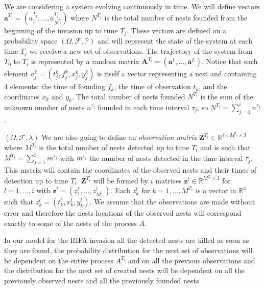 \documentclass[11pt,a4paper]{article}
\renewcommand{\vec}[1]{\mathbf{#1}}
\begin{document}
{{We are considering a system evolving continuously in time. We will define vectors $\vec{a}^{T_j} = (a^{T_j}_1, \dots, a^{T_j}_{N^{T_j}})$ where $N^{T_j}$ is the total number of nests founded from the beginning of the invasion up to time $T_j$. These vectors are defined on a probability space $(\Omega, \mathcal{F}, \mathbb{P})$ and will represent the state of the system at each time $T_j$ we receive a new set of observations.
The trajectory of the system from $T_0$ to $T_i$ is represented by a random matrix $\vec{A}^{T_i} = (\vec{a}^1, \dots, \vec{a}^{L})$. Notice that each element $a^k_j = (t^k_j, f^k_j, x^k_j, y^k_j)$ is itself a vector representing a nest and containing 4 elements: the time of founding $f_k$, the time of observation $t_k$, and the coordinates $x_k$ and $y_k$. The total number of nests founded $N^{T_i}$ is the sum of the unknown number of nests $n^{\tau_j}$ founded in each time interval $\tau_j$, so $N^{T_i} = \sum_{j=1}^{i} n^{\tau_j}$. 

$(\Omega, \mathcal{F}, \lambda)$
We are also going to define an \textit{observation matrix} $\vec{Z}^{T_i} \in \mathbb{R}^{i \times M^{T_i} \times 3}$ where $M^{T_i}$ is the total number of nests detected up to time $T_i$ and is such that $M^{T_i} = \sum_{j=1}^i m^{\tau_j}$ with $m^{\tau_j}$ the number of nests detected in the time interval $\tau_j$. This matrix will contain the coordinates of the observed nests and their times of detection up to time $T_i$. $\vec{Z}^{T_i}$ will be formed by $i$ matrices $\vec{z}^{l} \in \mathbb{R}^{M^{T_i} \times 3}$ for $l = 1, \dots, i$ with $\vec{z}^{l} = (z^l_1, \dots, z^l_{M^{\tau_i}})$. Each $z^l_k$ for $k=1, \dots, M^{T_i}$ is a vector in $\mathbb{R}^3$ such that $z^l_k = (t^l_k, x^l_k, y^l_k)$. We assume that the observations are made without error and therefore the nests locations of the observed nests will correspond exactly to some of the nests of the process $A$.


In our model for the RIFA invasion all the detected nests are killed as soon as they are found, the probability distribution for the next set of observations will be dependent on the entire process $A^{T_i}$ and on all the previous observations and the distribution for the next set of created nests will be dependent on all the previously observed nests and all the previously founded nests

}}
\end{document}
